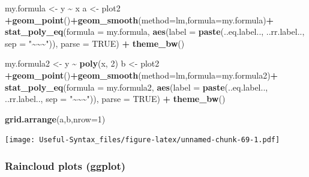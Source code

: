 \documentclass[
]{article}
\newenvironment{Shaded}{\begin{snugshade}}{\end{snugshade}}
\newcommand{\AttributeTok}[1]{\textcolor[rgb]{0.13,0.29,0.53}{#1}}
\newcommand{\ConstantTok}[1]{\textcolor[rgb]{0.56,0.35,0.01}{#1}}
\newcommand{\DecValTok}[1]{\textcolor[rgb]{0.00,0.00,0.81}{#1}}
\newcommand{\FunctionTok}[1]{\textcolor[rgb]{0.13,0.29,0.53}{\textbf{#1}}}
\newcommand{\NormalTok}[1]{#1}
\newcommand{\OtherTok}[1]{\textcolor[rgb]{0.56,0.35,0.01}{#1}}
\newcommand{\SpecialCharTok}[1]{\textcolor[rgb]{0.81,0.36,0.00}{\textbf{#1}}}
\newcommand{\StringTok}[1]{\textcolor[rgb]{0.31,0.60,0.02}{#1}}
\begin{document}
\begin{Shaded}
\begin{Highlighting}[]
\NormalTok{my.formula }\OtherTok{\textless{}{-}}\NormalTok{ y }\SpecialCharTok{\textasciitilde{}}\NormalTok{ x}
\NormalTok{a }\OtherTok{\textless{}{-}}\NormalTok{ plot2 }\SpecialCharTok{+}\FunctionTok{geom\_point}\NormalTok{()}\SpecialCharTok{+}\FunctionTok{geom\_smooth}\NormalTok{(}\AttributeTok{method=}\StringTok{\textquotesingle{}lm\textquotesingle{}}\NormalTok{,}\AttributeTok{formula=}\NormalTok{my.formula)}\SpecialCharTok{+}
  \FunctionTok{stat\_poly\_eq}\NormalTok{(}\AttributeTok{formula =}\NormalTok{ my.formula, }\FunctionTok{aes}\NormalTok{(}\AttributeTok{label =} \FunctionTok{paste}\NormalTok{(..eq.label.., ..rr.label..,}
                                                       \AttributeTok{sep =} \StringTok{"\textasciitilde{}\textasciitilde{}\textasciitilde{}"}\NormalTok{)), }\AttributeTok{parse =} \ConstantTok{TRUE}\NormalTok{) }\SpecialCharTok{+}
  \FunctionTok{theme\_bw}\NormalTok{()}

\NormalTok{my.formula2 }\OtherTok{\textless{}{-}}\NormalTok{ y }\SpecialCharTok{\textasciitilde{}} \FunctionTok{poly}\NormalTok{(x, }\DecValTok{2}\NormalTok{)}
\NormalTok{b }\OtherTok{\textless{}{-}}\NormalTok{ plot2 }\SpecialCharTok{+}\FunctionTok{geom\_point}\NormalTok{()}\SpecialCharTok{+}\FunctionTok{geom\_smooth}\NormalTok{(}\AttributeTok{method=}\StringTok{\textquotesingle{}lm\textquotesingle{}}\NormalTok{,}\AttributeTok{formula=}\NormalTok{my.formula2)}\SpecialCharTok{+}
  \FunctionTok{stat\_poly\_eq}\NormalTok{(}\AttributeTok{formula =}\NormalTok{ my.formula2, }\FunctionTok{aes}\NormalTok{(}\AttributeTok{label =} \FunctionTok{paste}\NormalTok{(..eq.label.., ..rr.label..,}
                                                        \AttributeTok{sep =} \StringTok{"\textasciitilde{}\textasciitilde{}\textasciitilde{}"}\NormalTok{)), }\AttributeTok{parse =} \ConstantTok{TRUE}\NormalTok{) }\SpecialCharTok{+}
  \FunctionTok{theme\_bw}\NormalTok{()}

\FunctionTok{grid.arrange}\NormalTok{(a,b,}\AttributeTok{nrow=}\DecValTok{1}\NormalTok{)}
\end{Highlighting}
\end{Shaded}

\texttt{[image: Useful-Syntax\_files/figure-latex/unnamed-chunk-69-1.pdf]}

\hypertarget{raincloud-plots-ggplot}{%
\subsubsection{Raincloud plots (ggplot)}\label{raincloud-plots-ggplot}}
\end{document}
